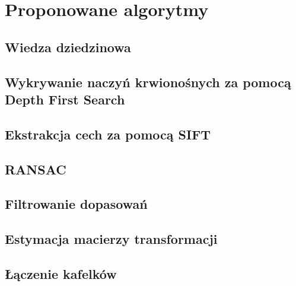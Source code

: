 %
\chapter{Proponowane algorytmy}
\label{sec:proponowane_algorytmy}

\section{Wiedza dziedzinowa}
\label{sec:proponowane_algorytmy:wiedza_dziedzinowa}

\section{Wykrywanie naczyń krwionośnych za pomocą Depth First Search}
\label{sec:proponowane_algorytmy:depth_first_search}

\section{Ekstrakcja cech za pomocą SIFT}
\label{sec:proponowane_algorytmy:sift}

\section{RANSAC}
\label{sec:proponowane_algorytmy:ransac}

\section{Filtrowanie dopasowań}
\label{sec:proponowane_algorytmy:filtrowanie}

\section{Estymacja macierzy transformacji}
\label{sec:proponowane_algorytmy:estymacja}

\section{Łączenie kafelków}
\label{sec:proponowane_algorytmy:laczenie_kafelkow}